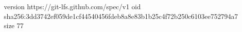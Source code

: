 version https://git-lfs.github.com/spec/v1
oid sha256:3dd3742ef059de1cf44540456fdeb8a8e83b1b25c4f72b250c6103ee752794a7
size 77
